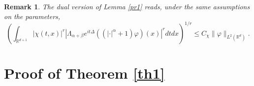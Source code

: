\documentclass[12pt]{article}
\newtheorem{remark}[theorem]{Remark}
\def \Rm {\mathbb R}
\newcommand{\calJ}{\mathcal J}
\begin{document}
\begin{remark} \label{dual2} The dual version of Lemma \ref{pr1} reads, under the same assumptions on the parameters,
$$
\left(\int_{\Rm^{d+1}} |\chi(t,x)|^r | \Lambda_{\alpha+\beta} e^{it \Delta}\left((|\cdot|^\alpha+1)\varphi\right)(x) |^r dtdx \right)^{1/r} \leq C_\chi \|\varphi\|_{L^{2}(\Rm^{d})}.
$$ 
\end{remark}
\section{Proof of Theorem \ref{th1}} \label{proofth}
\end{document}
